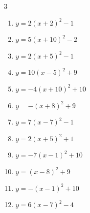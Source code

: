 \begin{multicols}{3}
\begin{enumerate}
  \item $\displaystyle y=2\left( x+2\right)^{2}-1$

        \phantom{$\displaystyle 頂点\left( -2 , -1 \right)$}

  \item $\displaystyle y=5\left( x+10\right)^{2}-2$

        \phantom{$\displaystyle 頂点\left( -10 , -2 \right)$}

  \item $\displaystyle y=2\left( x+5\right)^{2}-1$

        \phantom{$\displaystyle 頂点\left( -5 , -1 \right)$}

  \item $\displaystyle y=10\left( x-5\right)^{2}+9$

        \phantom{$\displaystyle 頂点\left( 5 , 9 \right)$}

  \item $\displaystyle y=-4\left( x+10\right)^{2}+10$

        \phantom{$\displaystyle 頂点\left( -10 , 10 \right)$}

  \item $\displaystyle y=-\left( x+8\right)^{2}+9$

        \phantom{$\displaystyle 頂点\left( -8 , 9 \right)$}

  \item $\displaystyle y=7\left( x-7\right)^{2}-1$

        \phantom{$\displaystyle 頂点\left( 7 , -1 \right)$}

  \item $\displaystyle y=2\left( x+5\right)^{2}+1$

        \phantom{$\displaystyle 頂点\left( -5 , 1 \right)$}

  \item $\displaystyle y=-7\left( x-1\right)^{2}+10$

        \phantom{$\displaystyle 頂点\left( 1 , 10 \right)$}

  \item $\displaystyle y=\left( x-8\right)^{2}+9$

        \phantom{$\displaystyle 頂点\left( 8 , 9 \right)$}

  \item $\displaystyle y=-\left( x-1\right)^{2}+10$

        \phantom{$\displaystyle 頂点\left( 1 , 10 \right)$}

  \item $\displaystyle y=6\left( x-7\right)^{2}-4$


\end{enumerate}
\end{multicols}
